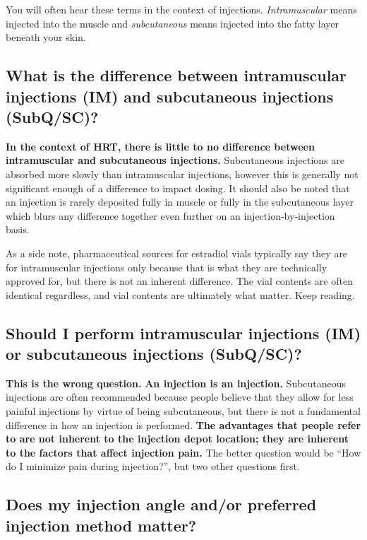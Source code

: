 \documentclass{article}
\begin{document}
You will often hear these terms in the context of injections. \textit{Intramuscular} means injected into the muscle and \textit{subcutaneous} means injected into the fatty layer beneath your skin.

\subsection{What is the difference between intramuscular injections (IM) and subcutaneous injections (SubQ/SC)?}

\textbf{In the context of HRT, there is little to no difference between intramuscular and subcutaneous injections.} Subcutaneous injections are absorbed more slowly than intramuscular injections, however this is generally not significant enough of a difference to impact dosing. It should also be noted that an injection is rarely deposited fully in muscle or fully in the subcutaneous layer which blurs any difference together even further on an injection-by-injection basis.

As a side note, pharmaceutical sources for estradiol vials typically say they are for intramuscular injections only because that is what they are technically approved for, but there is not an inherent difference. The vial contents are often identical regardless, and vial contents are ultimately what matter. Keep reading.

\subsection{Should I perform intramuscular injections (IM) or subcutaneous injections (SubQ/SC)?}

\textbf{This is the wrong question.} \textbf{An injection is an injection.} Subcutaneous injections are often recommended because people believe that they allow for less painful injections by virtue of being subcutaneous, but there is not a fundamental difference in how an injection is performed. \textbf{The advantages that people refer to are not inherent to the injection depot location; they are inherent to the factors that affect injection pain.} The better question would be “How do I minimize pain during injection?”, but two other questions first.

\subsection{Does my injection angle and/or preferred injection method matter?}\label{5-9}
\end{document}
